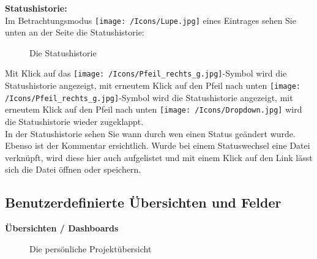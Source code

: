 \vspace{\baselineskip}

\textbf{Statushistorie:}\\
Im Betrachtungsmodus \texttt{[image: /Icons/Lupe.jpg]} eines Eintrages sehen Sie unten an der Seite die Statushistorie:

\begin{figure}[H]
\caption{Die Statushistorie}
\end{figure}

Mit Klick auf das \texttt{[image: /Icons/Pfeil\_rechts\_g.jpg]}-Symbol wird die Statushistorie  angezeigt, mit erneutem Klick auf den Pfeil nach unten \texttt{[image: /Icons/Pfeil\_rechts\_g.jpg]}-Symbol wird die Statushistorie angezeigt, mit erneutem Klick auf den Pfeil nach unten \texttt{[image: /Icons/Dropdown.jpg]} wird die Statushistorie wieder zugeklappt.\\
In der Statushistorie sehen Sie wann durch wen einen Status geändert wurde. Ebenso ist der Kommentar ersichtlich. Wurde bei einem Statuswechsel eine Datei verknüpft, wird diese hier auch aufgelistet  und mit einem Klick auf den Link lässt sich die Datei öffnen oder speichern.

\subsection{Benutzerdefinierte Übersichten und Felder}

\textbf{Übersichten / Dashboards}

\vspace{\baselineskip}

\begin{figure}[H]
\caption{Die persönliche Projektübersicht}
\end{figure}

